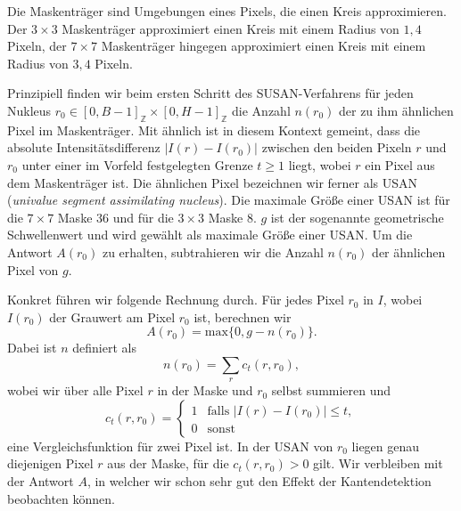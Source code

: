 \documentclass[a4paper, 11pt]{report}
\renewcommand{\emph}[1]{\textit{#1}}
\theoremstyle{definition}
\begin{document}
			Die Maskenträger sind Umgebungen eines Pixels, die einen Kreis approximieren. Der $3 \times 3$ Maskenträger approximiert einen Kreis mit einem Radius von $1,4$ Pixeln, der $7 \times 7$ Maskenträger hingegen approximiert einen Kreis mit einem Radius von $3,4$ Pixeln.

			Prinzipiell finden wir beim ersten Schritt des SUSAN-Verfahrens für jeden Nukleus $r_0 \in [0, B-1]_\mathbb{Z} \times [0, H-1]_\mathbb{Z}$ die Anzahl $n(r_0)$ der zu ihm ähnlichen Pixel im Maskenträger. Mit \glqq ähnlich\grqq{} ist in diesem Kontext gemeint, dass die absolute Intensitätsdifferenz $|I(r)-I(r_0)|$ zwischen den beiden Pixeln $r$ und $r_0$ unter einer im Vorfeld festgelegten Grenze $t \geq 1$ liegt, wobei $r$ ein Pixel aus dem Maskenträger ist. Die ähnlichen Pixel bezeichnen wir ferner als USAN (\emph{univalue segment assimilating nucleus}). Die maximale Größe einer USAN ist für die $7 \times 7$ Maske $36$ und für die $3 \times 3$ Maske $8$. $g$ ist der sogenannte geometrische Schwellenwert und wird gewählt als maximale Größe einer USAN. Um die Antwort $A(r_0)$ zu erhalten, subtrahieren wir die Anzahl $n(r_0)$ der ähnlichen Pixel von $g$.

			Konkret führen wir folgende Rechnung durch.
			Für jedes Pixel $r_0$ in $I$, wobei $I(r_0)$ der Grauwert am Pixel $r_0$ ist, berechnen wir
				$$A(r_0) = \text{max}\{0, g - n(r_0)\}.$$
			Dabei ist $n$ definiert als
				$$n(r_0) = \sum_r c_t(r, r_0),$$
			wobei wir über alle Pixel $r$ in der Maske und $r_0$ selbst summieren und
				$$
					c_t(r, r_0) =
						\begin{cases}
							1 	& \text{falls } |I(r) - I(r_0)| \leq t, 	\\
							0 	& \text{sonst}
						\end{cases}
				$$
			eine Vergleichsfunktion für zwei Pixel ist. In der USAN von $r_0$ liegen genau diejenigen Pixel $r$ aus der Maske, für die $c_t(r, r_0) > 0$ gilt. Wir verbleiben mit der Antwort $A$, in welcher wir schon sehr gut den Effekt der Kantendetektion beobachten können.
\end{document}
